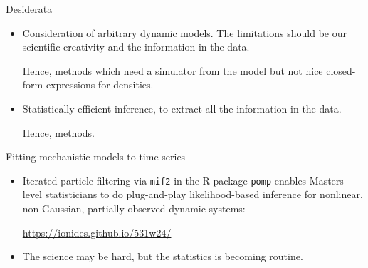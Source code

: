 \documentclass{beamer}
\begin{document}
\begin{frame}{Desiderata}

  \begin{itemize}
    \item Consideration of arbitrary dynamic models. The limitations should be our scientific creativity and the information in the data.

      \vspace{2mm}
      
     Hence,  methods which need a simulator from the model but not nice closed-form expressions for densities.

     \vspace{2mm}
     
    \item Statistically efficient inference, to extract all the information in the data.

      \vspace{2mm}
      
    Hence,  methods.

      \end{itemize}
  \end{frame}

\begin{frame}{Fitting mechanistic models to time series}
  
    \vspace{8mm}

    \begin{itemize}
    \item  Iterated particle filtering via \texttt{mif2} in the R package \texttt{pomp} enables Masters-level statisticians to do plug-and-play likelihood-based inference for nonlinear, non-Gaussian, partially observed dynamic systems:

      \vspace{2mm}

      \url{https://ionides.github.io/531w24/}

      \vspace{5mm}
      \item
      The science may be hard, but the statistics is becoming routine.


    \end{itemize}
\end{frame}
\end{document}
